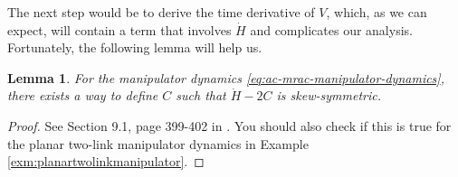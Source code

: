 \documentclass[
]{book}
\newtheorem{lemma}{Lemma}[chapter]
\theoremstyle{definition}
\theoremstyle{definition}
\theoremstyle{definition}
\theoremstyle{definition}
\theoremstyle{remark}
\begin{document}
The next step would be to derive the time derivative of \(V\), which, as we can expect, will contain a term that involves \(\dot{H}\) and complicates our analysis. Fortunately, the following lemma will help us.

\begin{lemma}
\protect\hypertarget{lem:skewsymmetricmanipulator}{}\label{lem:skewsymmetricmanipulator}For the manipulator dynamics \eqref{eq:ac-mrac-manipulator-dynamics}, there exists a way to define \(C\) such that \(\dot{H} - 2C\) is skew-symmetric.
\end{lemma}

\begin{proof}
See Section 9.1, page 399-402 in \citep{slotine91book-applied}. You should also check if this is true for the planar two-link manipulator dynamics in Example \ref{exm:planartwolinkmanipulator}.
\end{proof}
\end{document}
